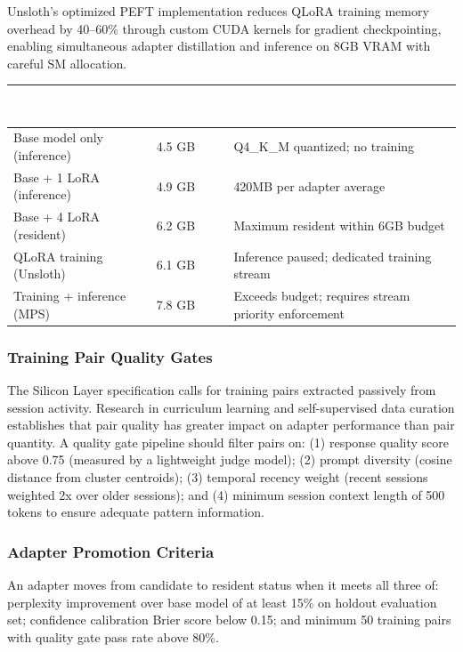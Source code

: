 \documentclass[11pt,letterpaper]{article}
\newcommand{\tableheader}[1]{\textbf{\sffamily\textcolor{white}{#1}}}
\begin{document}
Unsloth's optimized PEFT implementation reduces QLoRA training memory overhead by 40--60\% through custom CUDA kernels for gradient checkpointing, enabling simultaneous adapter distillation and inference on 8GB VRAM with careful SM allocation.

\begin{center}
\begin{tabularx}{\textwidth}{L{3.5cm}L{2cm}X}
\toprule
{}
\tableheader{Configuration} & \tableheader{VRAM Use} & \tableheader{Notes} \\
\midrule
Base model only (inference) & 4.5 GB & Q4\_K\_M quantized; no training \\
Base + 1 LoRA (inference) & 4.9 GB & 420MB per adapter average \\
Base + 4 LoRA (resident) & 6.2 GB & Maximum resident within 6GB budget \\
QLoRA training (Unsloth) & 6.1 GB & Inference paused; dedicated training stream \\
Training + inference (MPS) & 7.8 GB & Exceeds budget; requires stream priority enforcement \\
\bottomrule
\end{tabularx}
\end{center}

\subsubsection{Training Pair Quality Gates}

The Silicon Layer specification calls for training pairs extracted passively from session activity. Research in curriculum learning and self-supervised data curation establishes that pair quality has greater impact on adapter performance than pair quantity. A quality gate pipeline should filter pairs on: (1) response quality score above 0.75 (measured by a lightweight judge model); (2) prompt diversity (cosine distance from cluster centroids); (3) temporal recency weight (recent sessions weighted 2x over older sessions); and (4) minimum session context length of 500 tokens to ensure adequate pattern information.

\subsubsection{Adapter Promotion Criteria}

An adapter moves from candidate to resident status when it meets all three of: perplexity improvement over base model of at least 15\% on holdout evaluation set; confidence calibration Brier score below 0.15; and minimum 50 training pairs with quality gate pass rate above 80\%.
\end{document}
